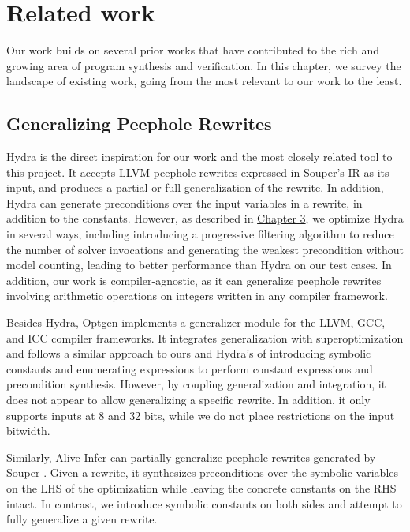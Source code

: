 \documentclass[review, anonymous, acmsmall]{acmart}
\begin{document}
\section{Related work}
Our work builds on several prior works that have contributed to the rich and growing area of program synthesis and verification. In this chapter, we survey the landscape of existing work, going from the most relevant to our work to the least.  

\subsection{Generalizing Peephole Rewrites}
Hydra \cite{mukherjee_hydra_2024} is the direct inspiration for our work and the most closely related tool to this project. It accepts LLVM peephole rewrites expressed in Souper's IR \cite{sasnauskas_souper_2018} as its input, and produces a partial or full generalization of the rewrite. In addition, Hydra can generate preconditions over the input variables in a rewrite, in addition to the constants. However, as described in \hyperref[implementation]{Chapter 3}, we optimize Hydra in several ways, including introducing a progressive filtering algorithm to reduce the number of solver invocations and generating the weakest precondition without model counting, leading to better performance than Hydra on our test cases. In addition, our work is compiler-agnostic, as it can generalize peephole rewrites involving arithmetic operations on integers written in any compiler framework.


Besides Hydra, Optgen \cite{franke_optgen_2015} implements a generalizer module for the LLVM, GCC, and ICC compiler frameworks. It integrates generalization with superoptimization and follows a similar approach to ours and Hydra's of introducing symbolic constants and enumerating expressions to perform constant expressions and precondition synthesis. However, by coupling generalization and integration, it does not appear to allow generalizing a specific rewrite. In addition, it only supports inputs at 8 and 32 bits, while we do not place restrictions on the input bitwidth. 

Similarly, Alive-Infer \cite{menendez_alive-infer_2017} can partially generalize peephole rewrites generated by Souper \cite{sasnauskas_souper_2018}. Given a rewrite, it synthesizes preconditions over the symbolic variables on the LHS of the optimization while leaving the concrete constants on the RHS intact. In contrast, we introduce symbolic constants on both sides and attempt to fully generalize a given rewrite. 
\end{document}
